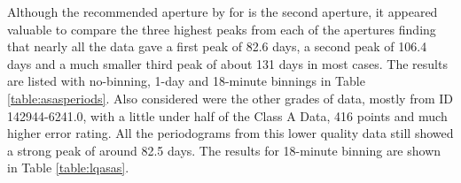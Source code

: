 Although the recommended aperture by {\asas} for {\prox} is the second aperture, it appeared valuable to compare the
three highest peaks from each of the apertures finding that nearly all the data gave a first peak of 82.6 days, a second
peak of 106.4 days and a much smaller third peak of about 131 days in most cases. The results are listed with
no-binning, 1-day and 18-minute binnings in Table \ref{table:asasperiods}. Also considered were the other grades of
{\asas} data, mostly from ID 142944-6241.0, with a little under half of the Class A Data, 416 points and much higher
error rating. All the periodograms from this lower quality data still showed a strong peak of around 82.5 days. The
results for 18-minute binning are shown in Table \ref{table:lqasas}.

\begin{table}[!htbp]
\centering
{}
\caption{Summary of three strongest periods taken from Class A values in {\asas} dataset for {\prox} from all apertures based upon magnitudes measured
  between December 2000 and September 2009. Results are shown for the raw data. 1-day binning and 18-minute binning.}
\protect\label{table:asasperiods}
\end{table}

